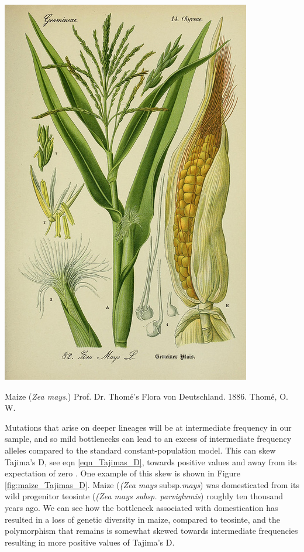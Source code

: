 \begin{marginfigure}[4cm]
\begin{center}
  \includegraphics[width = \textwidth]{illustration_images/Genetic_drift/maize/7845339168_66aa3d8ccc_z.jpg}
\end{center}
\caption{Maize ({\it Zea mays}.) Prof. Dr. Thomé's Flora von
  Deutschland. 1886. Thomé, O. W. } \label{fig:maize}  %
\end{marginfigure}

Mutations that arise on deeper lineages will be at intermediate frequency in our sample, and so mild bottlenecks
can lead to an excess of intermediate frequency alleles compared to
the standard constant-population model. This can skew 
Tajima's D, see eqn \ref{eqn_Tajimas_D}, towards positive values and away from its expectation of
zero . One example of this skew is shown in Figure
\ref{fig:maize_Tajimas_D}. Maize ({\it (Zea mays} subsp.{\it mays}) was domesticated from its wild progenitor teosinte ({\it (Zea mays
subsp. parviglumis}) roughly ten thousand years ago. We can see how the
 bottleneck associated with domestication has resulted in a loss of genetic diversity in maize, compared to teosinte, and the polymorphism that remains is somewhat skewed towards intermediate frequencies resulting in more positive values of Tajima's D.

